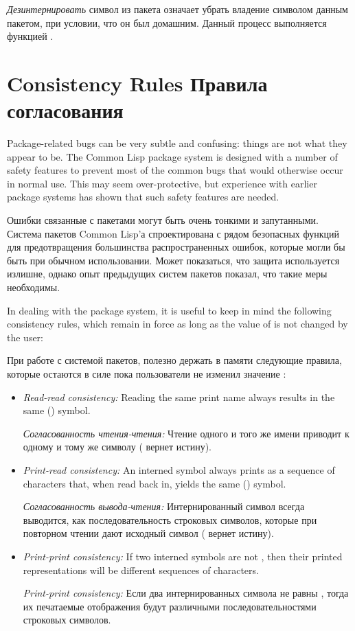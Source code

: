 \emph{Дезинтернировать} символ из пакета означает убрать владение символом
данным пакетом, при условии, что он был домашним. Данный процесс выполняется
функцией .

\section{Consistency Rules Правила согласования}

Package-related bugs can be very subtle and confusing: things are not
what they appear to be.  The Common Lisp package system is designed with
a number of safety features to prevent most of the common bugs that
would otherwise occur in normal use.  This may seem over-protective, but
experience with earlier package systems has shown that such safety
features are needed.

Ошибки связанные с пакетами могут быть очень тонкими и запутанными. Система
пакетов Common Lisp'а спроектирована с рядом безопасных функций для
предотвращения большинства распространенных ошибок, которые могли бы быть при
обычном использовании. Может показаться, что защита используется излишне,
однако опыт предыдущих систем пакетов показал, что такие меры необходимы.

In dealing with the package system, it is useful to keep in mind the
following consistency rules, which remain in force as long as the value
of  is not changed by the user:

При работе с системой пакетов, полезно держать в памяти следующие правила,
которые остаются в силе пока пользователи не изменил значение :

\begin{itemize}
\item
\emph{Read-read consistency:} Reading the same print name always results in
the same () symbol.

\emph{Согласованность чтения-чтения:} Чтение одного и того же имени приводит к
одному и тому же символу ( вернет истину).

\item
\emph{Print-read consistency:} An interned symbol always prints as a
sequence of characters that, when read back in, yields the same ()
symbol.

\emph{Согласованность вывода-чтения:} Интернированный символ всегда выводится,
как последовательность строковых символов, которые при повторном чтении дают
исходный символ ( вернет истину).

\item
\emph{Print-print consistency:} If two interned symbols are not , then
their printed representations will be different sequences of
characters.

\emph{Print-print consistency:} Если два интернированных символа не равны
, тогда их печатаемые отображения будут различными последовательностями
строковых символов.
\end{itemize}

